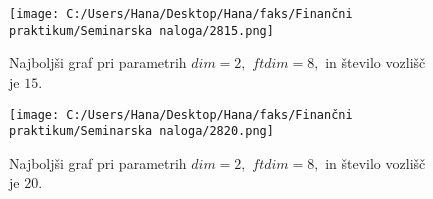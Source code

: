 \documentclass[12pt]{article}
\begin{document}
\begin{figure}[H]
    \centering
    \texttt{[image: C:/Users/Hana/Desktop/Hana/faks/Finančni praktikum/Seminarska naloga/2815.png]}
    \caption{Najboljši graf pri parametrih $dim = 2,$ $ftdim = 8,$ in število vozlišč je $15.$}
    \label{fig:slika2815}
\end{figure}

\begin{figure}[H]
    \centering
    \texttt{[image: C:/Users/Hana/Desktop/Hana/faks/Finančni praktikum/Seminarska naloga/2820.png]}
    \caption{Najboljši graf pri parametrih $dim = 2,$ $ftdim = 8,$ in število vozlišč je $20.$}
    \label{fig:slika2820}
\end{figure}
\end{document}
